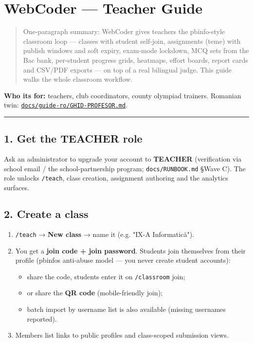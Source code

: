 \documentclass[
]{article}
\author{}
\date{}
\providecommand{\tightlist}{%
  \setlength{\itemsep}{0pt}\setlength{\parskip}{0pt}}
\begin{document}
{
\setcounter{tocdepth}{2}
\tableofcontents
}
\section{WebCoder --- Teacher Guide}\label{webcoder--teacher-guide}

\begin{quote}
One-paragraph summary: WebCoder gives teachers the pbinfo-style
classroom loop --- classes with student self-join, assignments (teme)
with publish windows and soft expiry, exam-mode lockdown, MCQ sets from
the Bac bank, per-student progress grids, heatmaps, effort boards,
report cards and CSV/PDF exports --- on top of a real bilingual judge.
This guide walks the whole classroom workflow.
\end{quote}

\textbf{Who it\textquotesingle s for:} teachers, club coordinators,
county olympiad trainers. Romanian twin:
\href{../guide-ro/GHID-PROFESOR.md}{\texttt{docs/guide-ro/GHID-PROFESOR.md}}.

\begin{center}\rule{0.5\linewidth}{0.5pt}\end{center}

\subsection{1. Get the TEACHER role}\label{1-get-the-teacher-role}

Ask an administrator to upgrade your account to \textbf{TEACHER}
(verification via school email / the school-partnership program;
\texttt{docs/RUNBOOK.md} §Wave C). The role unlocks \texttt{/teach},
class creation, assignment authoring and the analytics surfaces.

\subsection{2. Create a class}\label{2-create-a-class}

\begin{enumerate}
\def\labelenumi{\arabic{enumi}.}
\tightlist
\item
  \texttt{/teach} → \textbf{New class} → name it (e.g. "IX-A
  Informatică").
\item
  You get a \textbf{join code + join password}. Students join themselves
  from their profile (pbinfo\textquotesingle s anti-abuse model --- you
  never create student accounts):

  \begin{itemize}
  \tightlist
  \item
    share the code, students enter it on \texttt{/classroom} join;
  \item
    or share the \textbf{QR code} (mobile-friendly join);
  \item
    batch import by username list is also available (missing usernames
    reported).
  \end{itemize}
\item
  Members list links to public profiles and class-scoped submission
  views.
\end{enumerate}
\end{document}

